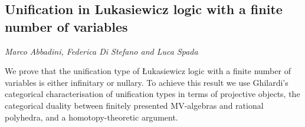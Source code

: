 \documentclass[../booklet.tex]{subfiles}
\begin{document}
\subsection[Unification in Lukasiewicz logic with a finite number of variables. {\it Marco Abbadini, Federica Di Stefano and Luca Spada}]{Unification in Lukasiewicz logic with a finite number of variables}
  

\begin{center}
  {\it Marco Abbadini, Federica Di Stefano and Luca Spada}
\end{center}

\vskip 0.8cm


We prove that the unification type of {\L}ukasiewicz logic with a finite number of variables is either infinitary or nullary.  To achieve this result we use Ghilardi's categorical characterisation of unification types in terms of projective objects,  the categorical duality between finitely presented MV-algebras and rational polyhedra, and a homotopy-theoretic argument.
\end{document}
